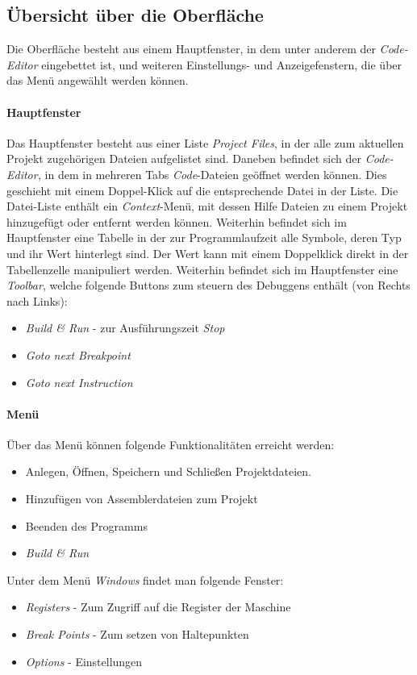\subsection{Übersicht über die Oberfläche}

Die Oberfläche besteht aus einem Hauptfenster, in dem unter anderem der \emph{Code-Editor} eingebettet ist, und weiteren Einstellungs- und Anzeigefenstern, die über das Menü angewählt werden können.

\paragraph{Hauptfenster}
Das Hauptfenster besteht aus einer Liste \emph{Project Files}, in der alle zum aktuellen Projekt zugehörigen Dateien aufgelistet sind. Daneben befindet sich der \emph{Code-Editor,} in dem in mehreren Tabs \emph{Code}-Dateien geöffnet werden können. Dies geschieht mit einem Doppel-Klick auf die entsprechende Datei in der Liste.
Die Datei-Liste enthält ein \emph{Context}-Menü, mit dessen Hilfe Dateien zu einem Projekt hinzugefügt oder entfernt werden können.
Weiterhin befindet sich im Hauptfenster eine Tabelle in der zur Programmlaufzeit alle Symbole, deren Typ und ihr Wert hinterlegt sind. Der Wert kann mit einem Doppelklick direkt in der Tabellenzelle manipuliert werden.
Weiterhin befindet sich im Hauptfenster eine \emph{Toolbar}, welche folgende Buttons zum steuern des Debuggens enthält (von Rechts nach Links):
\begin{itemize}
	\item \emph{Build \& Run} - zur Ausführungszeit \emph{Stop}
	\item \emph{Goto next Breakpoint}
	\item \emph{Goto next Instruction}
\end{itemize}

\paragraph{Menü}
Über das Menü können folgende Funktionalitäten erreicht werden:
\begin{itemize}
	\item Anlegen, Öffnen, Speichern und Schließen Projektdateien.
	\item Hinzufügen von Assemblerdateien zum Projekt
	\item Beenden des Programms
	\item \emph{Build \& Run}
\end{itemize}
Unter dem Menü \emph{Windows} findet man folgende Fenster:
\begin{itemize}
	\item \emph{Registers} - Zum Zugriff auf die Register der Maschine
	\item \emph{Break Points} - Zum setzen von Haltepunkten 
	\item \emph{Options} - Einstellungen
\end{itemize}

